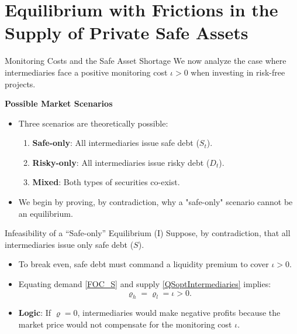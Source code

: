 \documentclass[11pt,aspectratio=169]{beamer}
\begin{document}
\section{Equilibrium with Frictions in the Supply of Private Safe Assets}

\begin{frame}{Monitoring Costs and the Safe Asset Shortage}
\small
We now analyze the case where intermediaries face a positive monitoring cost $\iota > 0$ when investing in risk-free projects.

\vspace{0.3cm}
\textbf{Possible Market Scenarios}
\begin{itemize}
    \item Three scenarios are theoretically possible:
    \begin{enumerate}
        \item \textbf{Safe-only}: All intermediaries issue safe debt ($S_t$).
        \item \textbf{Risky-only}: All intermediaries issue risky debt ($D_t$).
        \item \textbf{Mixed}: Both types of securities co-exist.
    \end{enumerate}
    \item We begin by proving, by contradiction, why a "safe-only" scenario cannot be an equilibrium.
\end{itemize}
\end{frame}
\begin{frame}{Infeasibility of a ``Safe-only'' Equilibrium (I)}
\small
Suppose, by contradiction, that all intermediaries issue only safe debt ($S$).

\vspace{0.3cm}
\begin{itemize}
    \item To break even, safe debt must command a liquidity premium to cover $\iota > 0$. 
    \item Equating demand \eqref{FOC_S} and supply \eqref{QSoptIntermediaries} implies:
    \begin{equation}
    \varrho_h = \varrho_l = \iota > 0.
    \end{equation}
    \item \textbf{Logic}: If $\varrho = 0$, intermediaries would make negative profits because the market price would not compensate for the monitoring cost $\iota$.
\end{itemize}
\end{frame}
\end{document}
